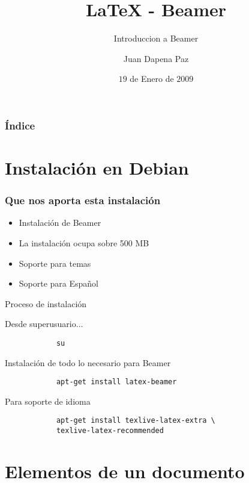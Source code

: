 \documentclass{beamer}
\title{LaTeX - Beamer}
\subtitle{Introduccion a Beamer}
\author{
	Juan Dapena Paz
}
\date{$19$ de Enero de $2009$}
\begin{document}
\begin{frame}
	\titlepage
\end{frame}

\begin{frame}
	\frametitle{Índice}
	\tableofcontents
\end{frame}

\section{Instalación en Debian}
	\begin{frame}
		\frametitle{Que nos aporta esta instalación}
			\begin{itemize}
				\item Instalación de Beamer
				\item La instalación ocupa sobre 500 MB
				\item Soporte para temas
				\item Soporte para Español
			\end{itemize}
	\end{frame}
	
	\begin{frame}[fragile]{Proceso de instalación}
		\begin{block}{Desde superusuario...}
		\begin{verbatim}
			su
		\end{verbatim}
		\end{block}
		\begin{block}{Instalación de todo lo necesario para Beamer}
		\begin{verbatim}
			apt-get install latex-beamer
		\end{verbatim}
		\end{block}
		\begin{block}{Para soporte de idioma}
		\begin{verbatim}
			apt-get install texlive-latex-extra \
			texlive-latex-recommended
		\end{verbatim}
		\end{block}
	\end{frame}

\section{Elementos de un documento}
\end{document}
